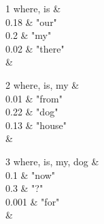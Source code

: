 \block
{1}
{where, is}
{
\cdots \& \\
0.18 \& \textrm{"our"} \\
0.2 \& \textrm{"my"} \\
0.02 \& \textrm{"there"} \\
\cdots \& \\
}

\begin{scope}[shift=({\hgap, 0})]
\block
{2}
{where, is, my}
{
\cdots \& \\
0.01 \& \textrm{"from"} \\
0.22 \& \textrm{"dog"} \\
0.13 \& \textrm{"house"} \\
\cdots \& \\
}
\end{scope}

\begin{scope}[shift=({0, -\vgap})]
\block
{3}
{where, is, my, dog}
{
\cdots \& \\
0.1 \& \textrm{"now"} \\
0.3 \& \textrm{"?"} \\
0.001 \& \textrm{"for"} \\
\cdots \& \\
}
\end{scope}